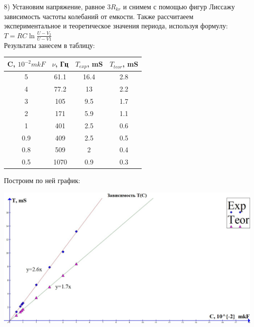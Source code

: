 \documentclass[a4paper,12pt]{article} %
\begin{document}
8) Установим напряжение, равное $3R_{kr}$ и снимем с помощью фигур Лиссажу зависимость частоты колебаний от емкости. Также рассчитаеем экспериментальное и теоретическое значения периода, используя формулу: $T=RC\ln\frac{U-V_2}{U-V1}$\\ Результаты занесем в таблицу:\\
\begin{tabular}{|c|c|c|c|}
\hline 
C, $10^{-2}  mkF$	 & $\nu$, Гц & $T_{exp}$, mS & $T_{teor}$, mS \\ 
\hline 
5 & 61.1 & 16.4 & 2.8 \\ 
\hline 
4 & 77.2 & 13 & 2.2 \\ 
\hline 
3 & 105 & 9.5 & 1.7 \\ 
\hline 
2 & 171 & 5.9 & 1.1 \\ 
\hline 
1 & 401 & 2.5 & 0.6 \\ 
\hline 
0.9 & 409 & 2.5 & 0.5 \\ 
\hline 
0.8 & 509 & 2 & 0.4 \\ 
\hline 
0.5 & 1070 & 0.9 & 0.3 \\ 
\hline 
\end{tabular} 



Построим по ней график:\\
\begin{center}
\includegraphics[scale=0.3]{3532}
\end{center}
\end{document}
